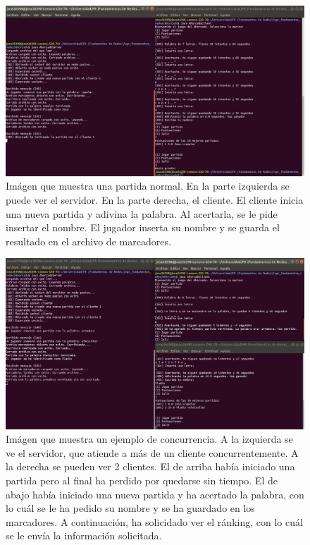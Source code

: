 \documentclass[11pt,a4paper]{article}
\begin{document}
	\begin{figure}[H]
	\centering
	\includegraphics[width=.8\textwidth]{./PartidaNormal.png}
	\caption{Imágen que muestra una partida normal. En la parte izquierda se puede ver el servidor. En la parte derecha, el cliente. El cliente inicia una nueva partida y adivina la palabra. Al acertarla, se le pide insertar el nombre. El jugador inserta su nombre y se guarda el resultado en el archivo de marcadores.} \label{fig:Partida normal}
	\end{figure}
	
	\begin{figure}[H]
	\centering
	\includegraphics[width=.8\textwidth]{./PartidaConcurrente.png}
	\caption{Imágen que muestra un ejemplo de concurrencia. A la izquierda se ve el servidor, que atiende a más de un cliente concurrentemente. A la derecha se pueden ver 2 clientes. El de arriba había iniciado una partida pero al final ha perdido por quedarse sin tiempo. El de abajo había iniciado una nueva partida y ha acertado la palabra, con lo cuál se le ha pedido su nombre y se ha guardado en los marcadores. A continuación, ha solicidado ver el ránking, con lo cuál se le envía la información solicitada.} \label{fig:Partida concurrente}
	\end{figure}
	
\end{document}
